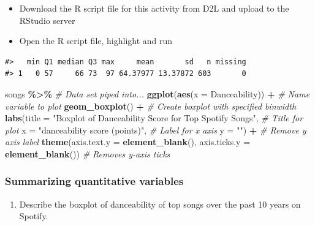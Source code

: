 \documentclass[
]{report}
\newenvironment{Shaded}{\begin{snugshade}}{\end{snugshade}}
\newcommand{\AttributeTok}[1]{\textcolor[rgb]{0.13,0.29,0.53}{#1}}
\newcommand{\CommentTok}[1]{\textcolor[rgb]{0.56,0.35,0.01}{\textit{#1}}}
\newcommand{\FunctionTok}[1]{\textcolor[rgb]{0.13,0.29,0.53}{\textbf{#1}}}
\newcommand{\NormalTok}[1]{#1}
\newcommand{\SpecialCharTok}[1]{\textcolor[rgb]{0.81,0.36,0.00}{\textbf{#1}}}
\newcommand{\StringTok}[1]{\textcolor[rgb]{0.31,0.60,0.02}{#1}}
\providecommand{\tightlist}{%
  \setlength{\itemsep}{0pt}\setlength{\parskip}{0pt}}
\begin{document}
\begin{itemize}
\item
  Download the R script file for this activity from D2L and upload to the RStudio server
\item
  Open the R script file, highlight and run
\end{itemize}

\begin{verbatim}
#>   min Q1 median Q3 max     mean       sd   n missing
#> 1   0 57     66 73  97 64.37977 13.37872 603       0
\end{verbatim}

\begin{Shaded}
\begin{Highlighting}[]
\NormalTok{songs }\SpecialCharTok{\%\textgreater{}\%} \CommentTok{\# Data set piped into...}
    \FunctionTok{ggplot}\NormalTok{(}\FunctionTok{aes}\NormalTok{(}\AttributeTok{x =}\NormalTok{ Danceability)) }\SpecialCharTok{+}   \CommentTok{\# Name variable to plot}
    \FunctionTok{geom\_boxplot}\NormalTok{() }\SpecialCharTok{+}  \CommentTok{\# Create boxplot with specified binwidth}
    \FunctionTok{labs}\NormalTok{(}\AttributeTok{title =} \StringTok{"Boxplot of Danceability Score for Top Spotify Songs"}\NormalTok{, }\CommentTok{\# Title for plot}
         \AttributeTok{x =} \StringTok{"danceability score (points)"}\NormalTok{, }\CommentTok{\# Label for x axis}
         \AttributeTok{y =} \StringTok{""}\NormalTok{) }\SpecialCharTok{+} \CommentTok{\# Remove y axis label}
    \FunctionTok{theme}\NormalTok{(}\AttributeTok{axis.text.y =} \FunctionTok{element\_blank}\NormalTok{(), }
          \AttributeTok{axis.ticks.y =} \FunctionTok{element\_blank}\NormalTok{()) }\CommentTok{\# Removes y{-}axis ticks}
\end{Highlighting}
\end{Shaded}

\subsubsection*{Summarizing quantitative variables}\label{summarizing-quantitative-variables-2}

\begin{enumerate}
\def\labelenumi{\arabic{enumi}.}
\tightlist
\item
  Describe the boxplot of danceability of top songs over the past 10 years on Spotify.
\end{enumerate}
\end{document}
